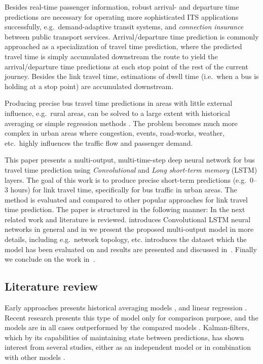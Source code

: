 \documentclass[preprint,12pt]{elsarticle}
\begin{document}
Besides real-time passenger information, robust arrival- and departure time predictions are necessary for operating more sophisticated ITS applications successfully, e.g.\ demand-adaptive transit systems, and \emph{connection insurance} between public transport services. Arrival/departure time prediction is commonly approached as a specialization of travel time prediction, where the predicted travel time is simply accumulated downstream the route to yield the arrival/departure time predictions at each stop point of the rest of the current journey. Besides the link travel time, estimations of dwell time (i.e.\ when a bus is holding at a stop point) are accumulated downstream.

Producing precise bus travel time predictions in areas with little external influence, e.g.\ rural areas, can be solved to a large extent with historical averaging or simple regression methods \cite{Williams2003,Altinkaya2013}. The problem becomes much more complex in urban areas where congestion, events, road-works, weather, etc.\ highly influences the traffic flow and passenger demand.

This paper presents a multi-output, multi-time-step deep neural network for bus travel time prediction using \emph{Convolutional} and \emph{Long short-term memory} (LSTM) \cite{Lstm1,Lstm2} layers. The goal of this work is to produce precise short-term predictions (e.g.\ 0--3 hours) for link travel time, specifically for bus traffic in urban areas. The method is evaluated and compared to other popular approaches for link travel time prediction. The paper is structured in the following manner: In the next related work and literature is reviewed.  introduces Convolutional LSTM neural networks in general and in  we present the proposed multi-output model in more details, including e.g.\ network topology, etc.  introduces the dataset which the model has been evaluated on and results are presented and discussed in~. Finally we conclude on the work in~.

\subsection{Literature review}
Early approaches presents historical averaging models \cite{Dailey1999,Sun2007}, and linear regression \cite{Patnaik2004}. Recent research presents this type of model only for comparison purpose, and the models are in all cases outperformed by the compared models \cite{Shalaby2004,Jeong2005}. Kalman-filters, which by its capabilities of maintaining state between predictions, has shown interest from several studies, either as an independent model \cite{Chen2001,Shalaby2004} or in combination with other models \cite{Zaki2013,Bai2015}. 
\end{document}

